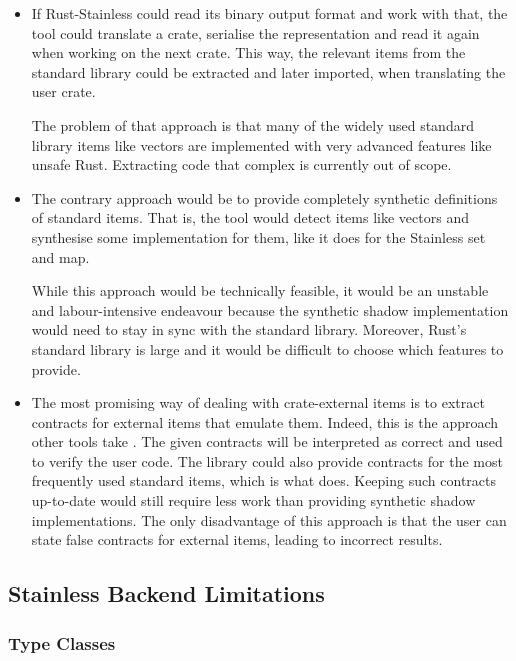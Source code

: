 \begin{itemize}

\item If Rust-Stainless could read its binary output format and work with that,
the tool could translate a crate, serialise the representation and read it again
when working on the next crate. This way, the relevant items from the standard
library could be extracted and later imported, when translating the user crate.

The problem of that approach is that many of the widely used standard library
items like vectors are implemented with very advanced features like unsafe Rust.
Extracting code that complex is currently out of scope.

\item The contrary approach would be to provide completely synthetic definitions
of standard items. That is, the tool would detect items like vectors and
synthesise some implementation for them, like it does for the Stainless set and
map.

While this approach would be technically feasible, it would be an unstable and
labour-intensive endeavour because the synthetic shadow implementation would
need to stay in sync with the standard library. Moreover, Rust's standard
library is large and it would be difficult to  choose which features to provide.

\item The most promising way of dealing with crate-external items is to extract
contracts for external items that emulate them. Indeed, this is the approach
other tools take \cite{prusti, mirai}. The given contracts will be interpreted
as correct and used to verify the user code. The library could also provide
contracts for the most frequently used standard items, which is what
\cite{mirai} does. Keeping such contracts up-to-date would still require less
work than providing synthetic shadow implementations. The only disadvantage of
this approach is that the user can state false contracts for external items,
leading to incorrect results.

\end{itemize}

\subsection{Stainless Backend Limitations}

\subsubsection{Type Classes}

